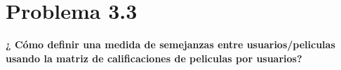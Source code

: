 \section*{Problema 3.3}

\textbf{¿ Cómo definir una medida de semejanzas entre usuarios/peliculas usando la matriz de calificaciones de peliculas por usuarios?}
